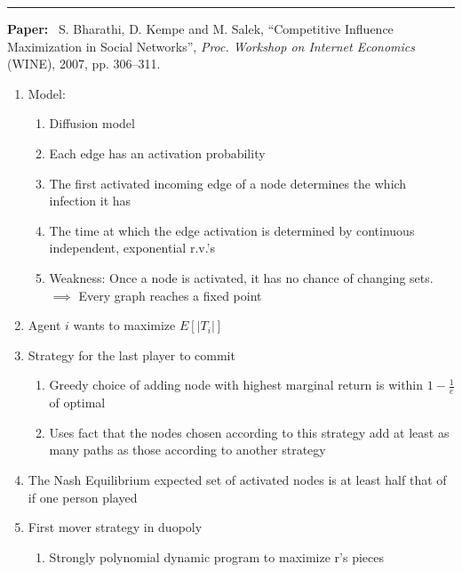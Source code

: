 \documentclass[11pt]{article}
\begin{document}
\smallskip

\noindent
\rule{\textwidth}{0.01in}

\clearpage

\noindent
\textbf{Paper:}~
S. Bharathi, D. Kempe and M. Salek, ``Competitive Influence
Maximization in Social Networks”, \emph{Proc. Workshop on Internet Economics}
(WINE), 2007, pp. 306--311.

\medskip

\begin{enumerate}
    \item Model:
    \begin{enumerate}
        \item Diffusion model
        
        \item Each edge has an activation probability
        
        \item The first activated incoming edge of a node determines the which infection it has
        
        \item The time at which the edge activation is determined by continuous independent, exponential r.v.'s
        
        \item Weakness: Once a node is activated, it has no chance of changing sets.$\implies$ Every graph reaches a fixed point
    \end{enumerate}
    \item Agent $i$ wants to maximize $E[|T_{i}|]$
    \item Strategy for the last player to commit
    \begin{enumerate}
    
        \item Greedy choice of adding node with highest 
        marginal return is within $1-\frac{1}{e}$ of optimal
        
        \item Uses fact that the nodes chosen according to this strategy add at least as many paths as those according to another strategy
        
    \end{enumerate}
    
    \item The Nash Equilibrium expected set of activated nodes is at least half that of if one person played
    
    \item First mover strategy in duopoly
    \begin{enumerate}
        \item Strongly polynomial dynamic program to maximize r's pieces
    \end{enumerate}
    

\end{enumerate}
\end{document}
